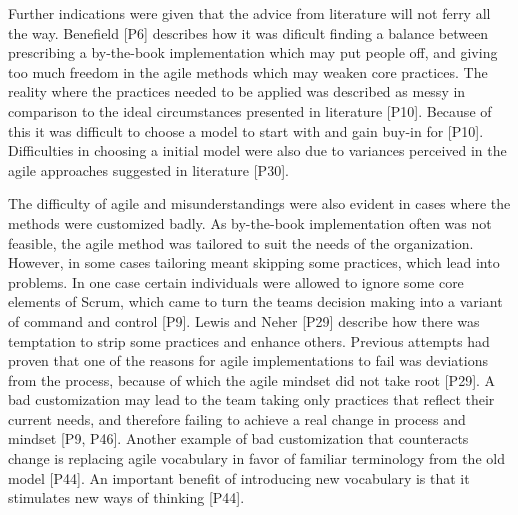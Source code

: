 \documentclass[preprint,authoryear,12pt]{elsarticle}
\begin{document}

Further indications were given that the advice from literature will not ferry
all the way. Benefield [P6] describes how it was dificult finding a balance
between prescribing a by-the-book implementation which may put people off, and
giving too much freedom in the agile methods which may weaken core practices.
The reality where the practices needed to be applied was described as messy in
comparison to the ideal circumstances presented in literature [P10]. Because of
this it was difficult to choose a model to start with and gain buy-in for [P10].
Difficulties in choosing a initial model were also due to variances perceived in
the agile approaches suggested in literature [P30].



The difficulty of agile and misunderstandings were also evident in cases where
the methods were customized badly. As by-the-book implementation often was not
feasible, the agile method was tailored to suit the needs of the organization.
However, in some cases tailoring meant skipping some practices, which lead into
problems. In one case certain individuals were allowed to ignore some core
elements of Scrum, which came to turn the teams decision making into a variant
of command and control [P9].
Lewis and Neher [P29] describe how there was temptation to strip some practices
and enhance others. Previous attempts had proven that one of the reasons for
agile implementations to fail was deviations from the process, because of which
the agile mindset did not take root [P29]. A bad customization may lead to the
team taking only practices that reflect their current needs, and therefore
failing to achieve a real change in process and mindset [P9, P46].
Another example of bad customization that counteracts change is replacing agile
vocabulary in favor of familiar terminology from the old model [P44]. An
important benefit of introducing new vocabulary is that it stimulates new ways
of thinking [P44].
\end{document}
